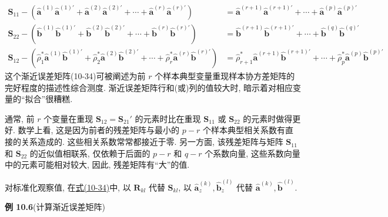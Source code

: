 
\label{eq:10-34}
\begin{equation}
\begin{aligned}
\mathbf{S}_{11}-(\hat{\mathbf{a}}^{(1)}\hat{\mathbf{a}}^{(1)'}+\hat{\mathbf{a}}^{(2)}\hat{\mathbf{a}}^{(2)'}+\cdots+\hat{\mathbf{a}}^{(r)}\hat{\mathbf{a}}^{(r)'})&=\hat{\mathbf{a}}^{(r+1)}\hat{\mathbf{a}}^{(r+1)'}+\cdots+\hat{\mathbf{a}}^{(p)}\hat{\mathbf{a}}^{(p)'}\\
\mathbf{S}_{22}-(\hat{\mathbf{b}}^{(1)}\hat{\mathbf{b}}^{(1)'}+\hat{\mathbf{b}}^{(2)}\hat{\mathbf{b}}^{(2)'}+\cdots+\hat{\mathbf{b}}^{(r)}\hat{\mathbf{b}}^{(r)'})&=\hat{\mathbf{b}}^{(r+1)}\hat{\mathbf{b}}^{(r+1)'}+\cdots+\hat{\mathbf{b}}^{(q)}\hat{\mathbf{b}}^{(q)'}\\
\mathbf{S}_{12}-(\hat{\rho}_1^*\hat{\mathbf{a}}^{(1)}\hat{\mathbf{b}}^{(1)'}+\hat{\rho}_2^*\hat{\mathbf{a}}^{(2)}\hat{\mathbf{b}}^{(2)'}+\cdots+\hat{\rho}_r^*\hat{\mathbf{a}}^{(r)}\hat{\mathbf{b}}^{(r)'})&=\hat{\rho}_{r+1}^*\hat{\mathbf{a}}^{(r+1)}\hat{\mathbf{b}}^{(r+1)'}+\cdots+\hat{\rho}_p^*\hat{\mathbf{a}}^{(p)}\hat{\mathbf{b}}^{(p)'}
\end{aligned}
\tag{10-34}
\end{equation}
这个渐近误差矩阵(10-34)可被阐述为前 $r$ 个样本典型变量重现样本协方差矩阵的完好程度的描述性综合测度. 渐近误差矩阵行和(或)列的值较大时, 暗示着对相应变量的“拟合”很糟糕.

通常, 前 $r$ 个变量在重现 $\mathbf{S}_{12}=\mathbf{S}_{21}'$ 的元素时比在重现 $\mathbf{S}_{11}$ 或 $\mathbf{S}_{22}$ 的元素时做得更好. 数学上看, 这是因为前者的残差矩阵与最小的 $p-r$ 个样本典型相关系数有直接的关系造成的. 这些相关系数常常都接近于零. 另一方面, 该残差矩阵与矩阵 $\mathbf{S}_{11}$ 和 $\mathbf{S}_{22}$ 的近似值相联系, 仅依赖于后面的 $p-r$ 和 $q-r$ 个系数向量, 这些系数向量中的元素可能相对较大, 因此, 残差矩阵有“大”的值.

对标准化观察值, 在\hyperref[eq:10-34]{式(10-34)}中, 以 $\mathbf{R}_{kl}$ 代替 $\mathbf{S}_{kl}$, 以 $\hat{\mathbf{a}}_z^{(k)},\hat{\mathbf{b}}_z^{(l)}$ 代替 $\hat{\mathbf{a}}^{(k)},\hat{\mathbf{b}}^{(l)}$.

\noindent\textbf{例 10.6}\quad (计算渐近误差矩阵)

